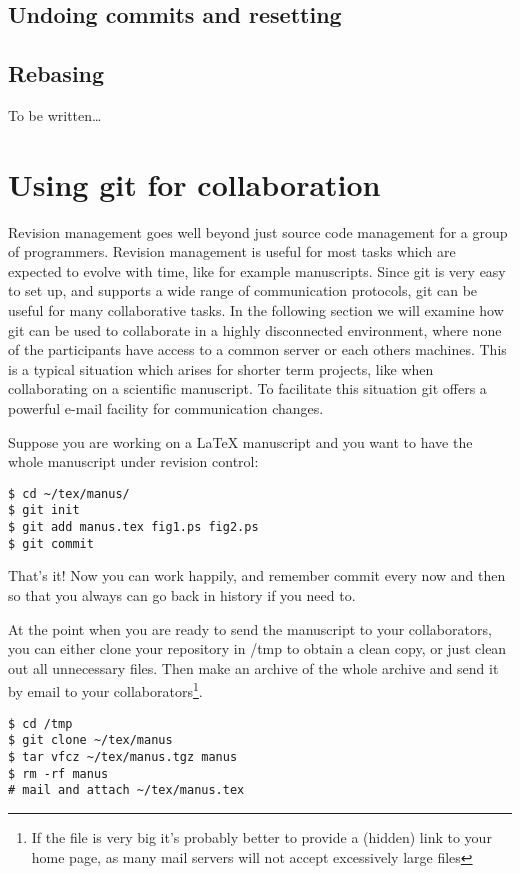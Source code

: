 \documentclass[a4paper,10pt]{article}
\begin{document}
\subsection{Undoing commits and resetting}

\subsection{Rebasing}
To be written\ldots

\section{Using git for collaboration}
Revision management goes well beyond just source code management for a group
of programmers. Revision management is useful for most tasks which are
expected to evolve with time, like for example manuscripts.
Since git is very easy to set up, and supports a wide range of communication
protocols, git can be useful for many collaborative tasks. In the following
section we will examine how git can be used to collaborate in a highly
disconnected environment, where none of the participants have access to a
common server or each others machines. This is a typical situation which
arises for shorter term projects, like when collaborating on a scientific
manuscript. To facilitate this situation git offers a powerful e-mail facility
for communication changes.

Suppose you are working on a LaTeX manuscript and you want to have the whole
manuscript under revision control:
\begin{verbatim}
$ cd ~/tex/manus/
$ git init
$ git add manus.tex fig1.ps fig2.ps
$ git commit
\end{verbatim}
That's it! Now you can work happily, and remember commit every now and then so
that you always can go back in history if you need to. 

At the point when you are ready to send the manuscript to your collaborators,
you can either clone your repository in /tmp to obtain a clean copy, or just
clean out all unnecessary files. Then make an archive of the whole archive and
send it by email to your collaborators\footnote{If the file is very big it's
probably better to provide a (hidden) link to your home page, as many mail
servers will not accept excessively large files}. 
\begin{verbatim}
$ cd /tmp
$ git clone ~/tex/manus
$ tar vfcz ~/tex/manus.tgz manus
$ rm -rf manus
# mail and attach ~/tex/manus.tex
\end{verbatim}
\end{document}
